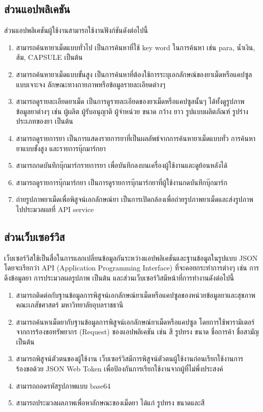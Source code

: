 	\subsection{ส่วนแอปพลิเคชัน}

		ส่วนแอปพลิเคชันผู้ใช้งานสามารถใช้งานฟังก์ชันดังต่อไปนี้

	\begin{enumerate}
		\item สามารถค้นหายาเม็ดแบบทั่วไป
		เป็นการค้นหาที่ใช้ key word ในการค้นหา เช่น para, น้ำเงิน, ส้ม, CAPSULE เป็นต้น 
		\item สามารถค้นหายาเม็ดแบบขั้นสูง
		เป็นการค้นหาที่ต้องใช้การระบุเอกลักษณ์ของยาเม็ดหรือแคปซูลแบบเจาะจง ลักษณะทางกายภาพหรือข้อมูลรายละเอียดต่างๆ
		\item สามารถดูรายละเอียดยาเม็ด
		เป็นการดูรายละเอียดของยาเม็ดหรือแคปซูลนั้นๆ ได้ทั้งดูรูปภาพ ข้อมูลยาต่างๆ เช่น ผู้ผลิต ผู้รับอนุญาติ ผู้จำหน่วย ขนาด กว้าง ยาว รูปแบบผลิตภัณฑ์ รูปร่าง ประเภทของยา เป็นต้น
		\item สามารถดูรายการยา
		เป็นการแสดงรายการยาที่เป็นผลลัพธ์จากการค้นหายาเม็ดแบบทั่ว การค้นหายาแบบขั้งสูง และรายการบุ๊กมาร์กยา
		\item สามารถกดบันทึกบุ๊กมาร์กรายการยา
		เพื่อบันทึกลงบนเครื่องผู้ใช้งานและดูย้อนหลังได้
		\item สามารถดูรายการบุ๊กมาร์กยา
		เป็นการดูรายการบุ๊กมาร์กยาที่ผู้ใช้งานกดบันทึกบุ๊กมาร์ก
		\item ถ่ายรูปภาพยาเม็ดเพื่อพิสูจน์เอกลักษณ์ยา
		เป็นการเปิดกล้องเพื่อถ่ายรูปภาพยาเม็ดและส่งรูปภาพไปประมวลผลที่ API service 
	\end{enumerate}

	\subsection{ส่วนเว็บเซอร์วิส}
	เว็บเซอร์วิสใช้เป็นสื่อในการแลกเปลี่ยนข้อมูลกันระหว่างแอปพลิเคชันและฐานข้อมูลในรูปแบบ JSON 
	โดยจะเรียกว่า API (Application Programming Interface) 
	ที่จะคอยกระทำการต่างๆ เช่น การดึงข้อมูลยา การประมวลผลรูปภาพ เป็นต้น 
	และส่วนเว็บเซอร์วิสมีหน้าที่การทำงานดังต่อไปนี้
	\begin{enumerate}
		\item สามารถติดต่อกับฐานข้อมูลการพิสูจน์เอกลักษณ์ยาเม็ดหรือแคปซูลของหน่วยข้อมูลยาและสุขภาพ คณะเภสัชศาสตร์ มหาวิทยาลัยอุบลราชธานี 
		\item สามารถค้นหาเม็ดยากับฐานข้อมูลการพิสูจน์เอกลักษณ์ยาเม็ดหรือแคปซูล 
		โดยการใช้พารามิเตอร์จากการร้องขอทรัพยากร (Request) ของแอปพลิเคชัน เช่น สี รูปทรง ขนาด ชื่อการค้า ชื่อสามัญ เป็นต้น 
		\item สามารถพิสูจน์ตัวตนของผู้ใช้งาน 
		เว็บเซอร์วิสมีการพิสูจน์ตัวตนผู้ใช้งานก่อนเรียกใช้งานการร้องขอด้วย JSON Web Token 
		เพื่อป้องกันการเรียกใช้งานจากผู้ที่ไม่พึ่งประสงค์ 
		\item สามารถถอดรหัสรูปภาพแบบ base64 
		\item สามารถประมวลผลภาพเพื่อหาลักษณะของเม็ดยา 
		ได้แก่ รูปทรง ขนาดและสี 
	\end{enumerate}

